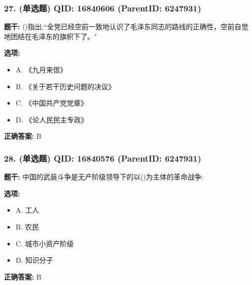 \documentclass[12pt,UTF8]{ctexart}
\begin{document}
\subsubsection*{27. (单选题) \small QID: 16840606 (ParentID: 6247931)}

\textbf{题干:}
()指出:“全党已经空前一致地认识了毛泽东同志的路线的正确性，空前自觉地团结在毛泽东的旗帜下了。"



\textbf{选项:}
\begin{itemize}[leftmargin=*]

  \item A. 《九月来信》

  \item B. 《关于若干历史问题的决议》

  \item C. 《中国共产党党章》

  \item D. 《论人民民主专政》

\end{itemize}

\textbf{正确答案:}
B

\vspace{0.3em}\hrulefill\vspace{0.7em}

\subsubsection*{28. (单选题) \small QID: 16840576 (ParentID: 6247931)}

\textbf{题干:}
中国的武装斗争是无产阶级领导下的以()为主体的革命战争:



\textbf{选项:}
\begin{itemize}[leftmargin=*]

  \item A. 工人

  \item B. 农民

  \item C. 城市小资产阶级

  \item D. 知识分子

\end{itemize}

\textbf{正确答案:}
B

\vspace{0.3em}\hrulefill\vspace{0.7em}
\end{document}
